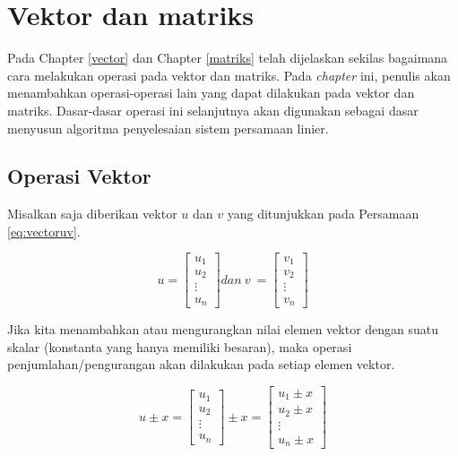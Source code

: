\documentclass[]{book}
\theoremstyle{definition}
\theoremstyle{definition}
\theoremstyle{definition}
\theoremstyle{remark}
\begin{document}
\hypertarget{vecmat}{%
\section{Vektor dan matriks}\label{vecmat}}

Pada Chapter \ref{vector} dan Chapter \ref{matriks} telah dijelaskan sekilas bagaimana cara melakukan operasi pada vektor dan matriks. Pada \emph{chapter} ini, penulis akan menambahkan operasi-operasi lain yang dapat dilakukan pada vektor dan matriks. Dasar-dasar operasi ini selanjutnya akan digunakan sebagai dasar menyusun algoritma penyelesaian sistem persamaan linier.

\hypertarget{operasivektor}{%
\subsection{Operasi Vektor}\label{operasivektor}}

Misalkan saja diberikan vektor \(u\) dan \(v\) yang ditunjukkan pada Persamaan \eqref{eq:vectoruv}.

\begin{equation}
u = \begin{bmatrix}
      u_1            \\[0.3em]
      u_2            \\[0.3em]
      \vdots         \\[0.3em] 
      u_n
     \end{bmatrix}
dan\ v\ = \begin{bmatrix}
      v_1            \\[0.3em]
      v_2            \\[0.3em]
      \vdots         \\[0.3em] 
      v_n
     \end{bmatrix}
  \label{eq:vectoruv}
\end{equation}

Jika kita menambahkan atau mengurangkan nilai elemen vektor dengan suatu skalar (konstanta yang hanya memiliki besaran), maka operasi penjumlahan/pengurangan akan dilakukan pada setiap elemen vektor.

\begin{equation}
u \pm x = \begin{bmatrix}
      u_1            \\[0.3em]
      u_2            \\[0.3em]
      \vdots         \\[0.3em] 
      u_n
     \end{bmatrix}
\pm x = \begin{bmatrix}
      u_1 \pm x            \\[0.3em]
      u_2 \pm x           \\[0.3em]
      \vdots         \\[0.3em] 
      u_n \pm x
     \end{bmatrix}
     \label{eq:addvector}
\end{equation}
\end{document}
